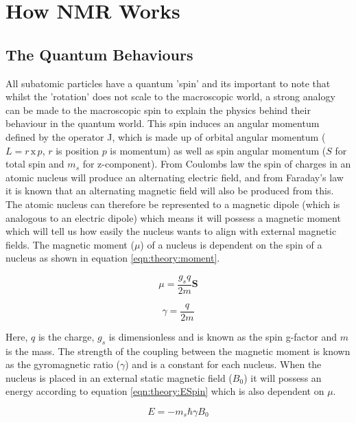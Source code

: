 \documentclass[class=article, crop=false]{standalone}
\begin{document}
 
\label{Chap:Theory}

\section{How NMR Works}
\subsection{The Quantum Behaviours}

All subatomic particles have a quantum 'spin' and its important to note that whilst the 'rotation' does not scale to the macroscopic world, a strong analogy can be made to the macroscopic spin to explain the physics behind their behaviour in the quantum world. This spin induces an angular momentum defined by the operator J, which is made up of orbital angular momentum ($L = r\, \textrm{x} \, p$, $r$ is position $p$ is momentum) as well as spin angular momentum ($S$ for total spin and $m_s$ for z-component). From Coulombs law\cite{Coulomb1785PremierMagnetisme} the spin of charges in an atomic nucleus will produce an alternating electric field, and from Faraday's law\cite{Faraday1821OnMagnetism} it is known that an alternating magnetic field will also be produced from this. The atomic nucleus can therefore be represented to a magnetic dipole (which is analogous to an electric dipole) which means it will possess a magnetic moment which will tell us how easily the nucleus wants to align with external magnetic fields. The magnetic moment ($\mu$) of a nucleus is dependent on the spin of a nucleus as shown in equation \ref{eqn:theory:moment}.

\begin{equation}
    \mu = \frac{g_sq}{2m} \mathbf{S}
    \label{eqn:theory:moment}
\end{equation}

\begin{equation}
    \gamma = \frac{q}{2m}
    \label{eqn:theory:gyro}
\end{equation}

Here, $q$ is the charge, $g_s$ is dimensionless and is known as the spin g-factor and $m$ is the mass. The strength of the coupling between the magnetic moment is known as the gyromagnetic ratio ($\gamma$) and is a constant for each nucleus. When the nucleus is placed in an external static magnetic field ($B_0$) it will possess an energy according to equation \ref{eqn:theory:ESpin} which is also dependent on $\mu$.

\begin{equation}
    E = -m_s\hbar \gamma B_0
    \label{eqn:theory:ESpin}
\end{equation}
\end{document}
